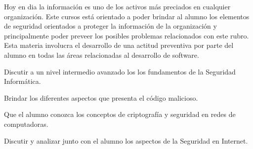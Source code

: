 \begin{syllabus}


\begin{justification}
Hoy en dia la información es uno de los activos más preciados en cualquier organización.
Este cursos está orientado a poder brindar al alumno los elementos de seguridad orientados a proteger la
información de la organización y principalmente poder preveer los posibles problemas relacionados con este rubro.
Esta materia involucra el desarrollo de una actitud preventiva por parte del alumno en todas las áreas
relacionadas al desarrollo de software.
\end{justification}

\begin{goals}
\item Discutir a un nivel intermedio avanzado los los fundamentos de la Seguridad Informática.
\item Brindar los diferentes aspectos que presenta el código malicioso.
\item Que el alumno conozca los conceptos de criptografí­a y seguridad en redes de computadoras.
\item Discutir y analizar junto con el alumno los aspectos de la Seguridad en Internet.
\end{goals}


\begin{outcomes}
    \item {}
    \item {}
    \item {}
    \item {}
    \item {}
    \item {}
    \item {}
\end{outcomes}


\begin{competences}
    \item {}
    \item {}
    \item {}
    \item {}
    \item {}
    \item {}
    \item {}
    \item {}
    \item {}
\end{competences}




\end{syllabus}
